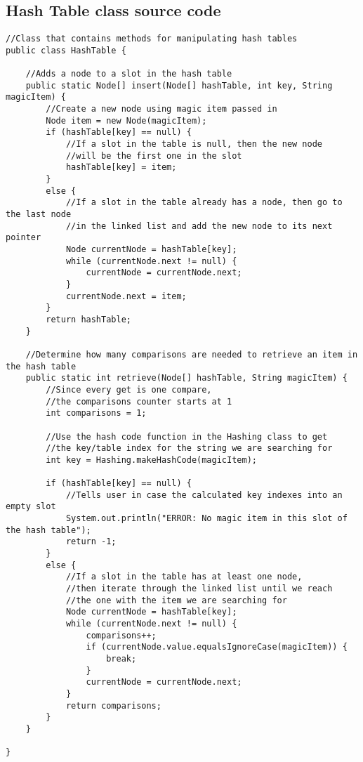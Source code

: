 \documentclass[letterpaper, 10pt,DIV=13]{scrartcl}
\numberwithin{equation}{section} %
\numberwithin{figure}{section} %
\numberwithin{table}{section} %
\begin{document}
\subsection{Hash Table class source code}
\lstset{numbers=left, numberstyle=\tiny, stepnumber=1, numbersep=5pt, basicstyle=\footnotesize\ttfamily}
\begin{lstlisting}[frame=single, ] 
//Class that contains methods for manipulating hash tables 
public class HashTable {
    
    //Adds a node to a slot in the hash table
    public static Node[] insert(Node[] hashTable, int key, String magicItem) {
        //Create a new node using magic item passed in
        Node item = new Node(magicItem);
        if (hashTable[key] == null) {
            //If a slot in the table is null, then the new node 
            //will be the first one in the slot
            hashTable[key] = item;
        }
        else {
            //If a slot in the table already has a node, then go to the last node 
            //in the linked list and add the new node to its next pointer
            Node currentNode = hashTable[key];
            while (currentNode.next != null) {
                currentNode = currentNode.next;
            }
            currentNode.next = item;
        }
        return hashTable;
    }

    //Determine how many comparisons are needed to retrieve an item in the hash table
    public static int retrieve(Node[] hashTable, String magicItem) {
        //Since every get is one compare, 
        //the comparisons counter starts at 1
        int comparisons = 1;

        //Use the hash code function in the Hashing class to get 
        //the key/table index for the string we are searching for
        int key = Hashing.makeHashCode(magicItem);

        if (hashTable[key] == null) {
            //Tells user in case the calculated key indexes into an empty slot
            System.out.println("ERROR: No magic item in this slot of the hash table");
            return -1;
        }
        else {
            //If a slot in the table has at least one node, 
            //then iterate through the linked list until we reach 
            //the one with the item we are searching for
            Node currentNode = hashTable[key];
            while (currentNode.next != null) {
                comparisons++;
                if (currentNode.value.equalsIgnoreCase(magicItem)) {
                    break;
                }
                currentNode = currentNode.next;
            }
            return comparisons;
        }
    }
    
}
\end{lstlisting}
\end{document}
